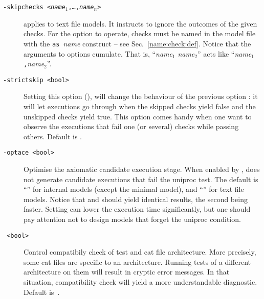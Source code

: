 \begin{description}
\item[{\tt -skipchecks <\textit{name}$_1$,\ldots,\textit{name}$_n$>}]
applies to text file models. It instructs \herd{} to ignore
the outcomes of the given checks. For the option to operate, checks must
be named in the model file with the \texttt{as }\textit{name} construct --
see Sec.~\ref{name:check:def}.
Notice that the arguments to  options cumulate.
That is, ``\textit{name}$_1$ \textit{name}$_2$'' acts like ``\textit{name}$_1$\texttt{,}\textit{name}$_2$''.

\item [{\tt -strictskip <bool>}] Setting this option (),
will change the behaviour of the previous option :
it will let executions go through when the skipped checks yield
false and the unskipped checks yield true. This option comes handy
when one want to observe the executions that fail one (or several) checks
while passing others. Default is .

\item[{\tt -optace <bool>}] Optimise the axiomatic candidate execution stage.
When enabled by ,  \herd{} does not generate candidate
executions that fail the uniproc test. The default is ``''
for internal models (except the minimal model), and ``'' for
text file models. Notice that 
and  should yield identical results,
the second being faster.
Setting  can lower the execution time significantly,
but one should pay attention not to design models that forget the uniproc
condition.

\item[{\tt {} <bool>}]
Control compatibily check of test and cat file
architecture. More precisely, some cat files are specific to an architecture.
Running tests of a different architecture on them will result in
cryptic error messages. In that situation, compatibility check will
yield a more understandable diagnostic. Default is~.


\end{description}

